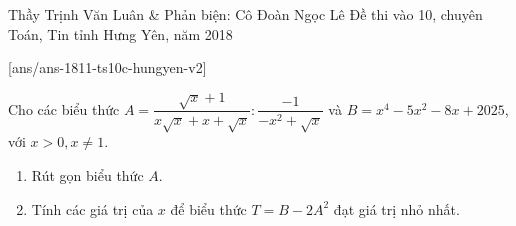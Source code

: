 
\begin{name}
{Thầy  Trịnh Văn Luân \& Phản biện: Cô Đoàn Ngọc Lê }
{Đề thi vào 10, chuyên Toán, Tin tỉnh Hưng Yên, năm 2018}
\end{name}
\setcounter{ex}{0}
[ans/ans-1811-ts10c-hungyen-v2]
\begin{ex}%
	Cho các biểu thức $A= \dfrac{\sqrt{x}+1}{x\sqrt{x}+ x+ \sqrt{x}}: \dfrac{-1}{-x^2+ \sqrt{x}}$ và $B= x^4- 5x^2- 8x+ 2025$, với $x>0, x \ne 1$.
	\begin{enumerate}
		\item Rút gọn biểu thức $A$.
		\item Tính các giá trị của $x$ để biểu thức $T= B- 2A^2$ đạt giá trị nhỏ nhất.
	\end{enumerate}
\end{ex}
